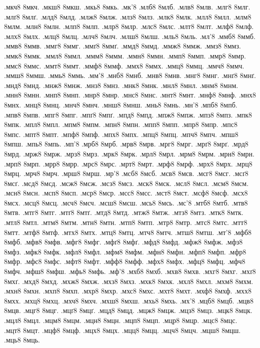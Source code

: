 {.мкч8 8мкч.
.мкш8 8мкш.
.мкь8 8мкь.
.мк'8
.млб8 8млб.
.млв8 8млв.
.млг8 8млг.
.млґ8 8млґ.
.млд8 8млд.
.млж8 8млж.
.млз8 8млз.
.млк8 8млк.
.млл8 8млл.
.млм8 8млм.
.млн8 8млн.
.млп8 8млп.
.млр8 8млр.
.млс8 8млс.
.млт8 8млт.
.млф8 8млф.
.млх8 8млх.
.млц8 8млц.
.млч8 8млч.
.млш8 8млш.
.мль8 8мль.
.мл'8
.ммб8 8ммб.
.ммв8 8ммв.
.ммг8 8ммг.
.ммґ8 8ммґ.
.ммд8 8ммд.
.ммж8 8ммж.
.ммз8 8ммз.
.ммк8 8ммк.
.ммл8 8ммл.
.ммм8 8ммм.
.ммн8 8ммн.
.ммп8 8ммп.
.ммр8 8ммр.
.ммс8 8ммс.
.ммт8 8ммт.
.ммф8 8ммф.
.ммх8 8ммх.
.ммц8 8ммц.
.ммч8 8ммч.
.ммш8 8ммш.
.ммь8 8ммь.
.мм'8
.мнб8 8мнб.
.мнв8 8мнв.
.мнг8 8мнг.
.мнґ8 8мнґ.
.мнд8 8мнд.
.мнж8 8мнж.
.мнз8 8мнз.
.мнк8 8мнк.
.мнл8 8мнл.
.мнм8 8мнм.
.мнн8 8мнн.
.мнп8 8мнп.
.мнр8 8мнр.
.мнс8 8мнс.
.мнт8 8мнт.
.мнф8 8мнф.
.мнх8 8мнх.
.мнц8 8мнц.
.мнч8 8мнч.
.мнш8 8мнш.
.мнь8 8мнь.
.мн'8
.мпб8 8мпб.
.мпв8 8мпв.
.мпг8 8мпг.
.мпґ8 8мпґ.
.мпд8 8мпд.
.мпж8 8мпж.
.мпз8 8мпз.
.мпк8 8мпк.
.мпл8 8мпл.
.мпм8 8мпм.
.мпн8 8мпн.
.мпп8 8мпп.
.мпр8 8мпр.
.мпс8 8мпс.
.мпт8 8мпт.
.мпф8 8мпф.
.мпх8 8мпх.
.мпц8 8мпц.
.мпч8 8мпч.
.мпш8 8мпш.
.мпь8 8мпь.
.мп'8
.мрб8 8мрб.
.мрв8 8мрв.
.мрг8 8мрг.
.мрґ8 8мрґ.
.мрд8 8мрд.
.мрж8 8мрж.
.мрз8 8мрз.
.мрк8 8мрк.
.мрл8 8мрл.
.мрм8 8мрм.
.мрн8 8мрн.
.мрп8 8мрп.
.мрр8 8мрр.
.мрс8 8мрс.
.мрт8 8мрт.
.мрф8 8мрф.
.мрх8 8мрх.
.мрц8 8мрц.
.мрч8 8мрч.
.мрш8 8мрш.
.мр'8
.мсб8 8мсб.
.мсв8 8мсв.
.мсг8 8мсг.
.мсґ8 8мсґ.
.мсд8 8мсд.
.мсж8 8мсж.
.мсз8 8мсз.
.мск8 8мск.
.мсл8 8мсл.
.мсм8 8мсм.
.мсн8 8мсн.
.мсп8 8мсп.
.мср8 8мср.
.мсс8 8мсс.
.мст8 8мст.
.мсф8 8мсф.
.мсх8 8мсх.
.мсц8 8мсц.
.мсч8 8мсч.
.мсш8 8мсш.
.мсь8 8мсь.
.мс'8
.мтб8 8мтб.
.мтв8 8мтв.
.мтг8 8мтг.
.мтґ8 8мтґ.
.мтд8 8мтд.
.мтж8 8мтж.
.мтз8 8мтз.
.мтк8 8мтк.
.мтл8 8мтл.
.мтм8 8мтм.
.мтн8 8мтн.
.мтп8 8мтп.
.мтр8 8мтр.
.мтс8 8мтс.
.мтт8 8мтт.
.мтф8 8мтф.
.мтх8 8мтх.
.мтц8 8мтц.
.мтч8 8мтч.
.мтш8 8мтш.
.мт'8
.мфб8 8мфб.
.мфв8 8мфв.
.мфг8 8мфг.
.мфґ8 8мфґ.
.мфд8 8мфд.
.мфж8 8мфж.
.мфз8 8мфз.
.мфк8 8мфк.
.мфл8 8мфл.
.мфм8 8мфм.
.мфн8 8мфн.
.мфп8 8мфп.
.мфр8 8мфр.
.мфс8 8мфс.
.мфт8 8мфт.
.мфф8 8мфф.
.мфх8 8мфх.
.мфц8 8мфц.
.мфч8 8мфч.
.мфш8 8мфш.
.мфь8 8мфь.
.мф'8
.мхб8 8мхб.
.мхв8 8мхв.
.мхг8 8мхг.
.мхґ8 8мхґ.
.мхд8 8мхд.
.мхж8 8мхж.
.мхз8 8мхз.
.мхк8 8мхк.
.мхл8 8мхл.
.мхм8 8мхм.
.мхн8 8мхн.
.мхп8 8мхп.
.мхр8 8мхр.
.мхс8 8мхс.
.мхт8 8мхт.
.мхф8 8мхф.
.мхх8 8мхх.
.мхц8 8мхц.
.мхч8 8мхч.
.мхш8 8мхш.
.мхь8 8мхь.
.мх'8
.мцб8 8мцб.
.мцв8 8мцв.
.мцг8 8мцг.
.мцґ8 8мцґ.
.мцд8 8мцд.
.мцж8 8мцж.
.мцз8 8мцз.
.мцк8 8мцк.
.мцл8 8мцл.
.мцм8 8мцм.
.мцн8 8мцн.
.мцп8 8мцп.
.мцр8 8мцр.
.мцс8 8мцс.
.мцт8 8мцт.
.мцф8 8мцф.
.мцх8 8мцх.
.мцц8 8мцц.
.мцч8 8мцч.
.мцш8 8мцш.
.мць8 8мць.
}
